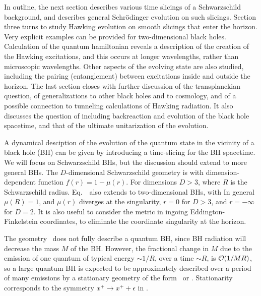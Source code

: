In outline, the next section describes various time slicings of a Schwarzschild background, and describes general Schr\"odinger evolution on such slicings.  Section 
three turns to study Hawking evolution on smooth slicings that enter the horizon.  Very explicit examples can be provided for two-dimensional black holes.  Calculation of the quantum hamiltonian reveals a description of the creation of the Hawking excitations, and this occurs at longer wavelengths, rather than microscopic wavelengths.  Other aspects of the evolving state are also studied, including the pairing (entanglement) between excitations inside and outside the horizon.  The last section closes with further discussion of the transplanckian question, of generalizations to other black holes and to cosmology, and of a possible connection to tunneling calculations of Hawking radiation.  It also discusses the question of including backreaction and evolution of the black hole spacetime, and that of the ultimate unitarization of the evolution.




A dynamical desciption of the evolution of the quantum state in the vicinity of a black hole (BH) can be given by introducing a time-slicing for the BH spacetime.  We will focus on  Schwarzschild BHs, but the discussion should extend to more general BHs.  The $D$-dimensional Schwarzschild geometry is
%
\eqn{}
%
with dimension-dependent function $f(r)=1-\mu(r)$.
For dimensions $D>3$,
%
\eqn{}
%
where $R$ is the Schwarzschild radius.  Eq.~\Schw\ also extends to
two-dimensional BHs, with
%
\eqn{}
%
In general $\mu(R)=1$, and $\mu(r)$ diverges at the singularity, $r=0$ for $D>3$, and $r=-\infty$ for $D=2$.
It is also useful to consider the metric in ingoing Eddington-Finkelstein coordinates,
%
\eqn{}
%
to eliminate the coordinate singularity at the horizon.

The geometry \Schw\ does not fully describe a quantum BH, since BH radiation will decrease the mass $M$ of the BH.  However, the fractional change in  $M$ due to the emission of one quantum of typical energy $\sim 1/R$, over a time $\sim R$, is ${\cal O}(1/MR)$, so a large quantum BH is expected to be approximately described over a period of many emissions by a stationary geometry of the form \Schw\ or \EF.  Stationarity corresponds to the symmetry $x^+\rightarrow x^+ + \epsilon$ in \EF.

